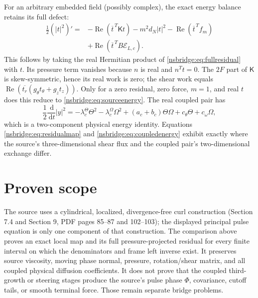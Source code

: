 \documentclass[11pt]{article}
\newcommand{\dd}{\,\mathrm d}
\begin{document}
For an arbitrary embedded field (possibly complex), the exact energy balance
retains its full defect:
\begin{equation}
 \begin{split}
 \frac12(|t|^2)'={}&-\operatorname{Re}(\overline t^{\,T}\mathsf Kt)
 -m^2d_N|t|^2-\operatorname{Re}(\overline t^{\,T}f_m)\\
 &+\operatorname{Re}(\overline t^{\,T}B\mathcal E_{L,c}).
 \end{split}
\end{equation}
This follows by taking the real Hermitian product of
\eqref{nsbridge:eq:fullresidual} with $t$. Its pressure term vanishes because $n$ is
real and $n^Tt=0$. The $2F$ part of $\mathsf K$ is skew-symmetric, hence
its real work is zero; the shear work equals
$\operatorname{Re}(\overline{t_r}(g_\theta t_\theta+g_z t_z))$.
Only for a zero residual, zero force, $m=1$, and real $t$ does this reduce
to \eqref{nsbridge:eq:sourceenergy}. The real coupled pair has
\begin{equation}
 \frac12\frac{\dd}{\dd t}|y|^2
 =-\lambda_c^\Theta\Theta^2-\lambda_c^\Omega\Omega^2
 +(a_c+b_c)\Theta\Omega+c_\theta\Theta+c_\omega\Omega,
 \label{nsbridge:eq:coupledenergy}
\end{equation}
which is a two-component physical energy identity.  Equations
\eqref{nsbridge:eq:residualmap} and \eqref{nsbridge:eq:coupledenergy} exhibit exactly where the
source's three-dimensional shear flux and the coupled pair's two-dimensional
exchange differ.

\section{Proven scope}
The source uses a cylindrical, localized, divergence-free curl construction
(Section 7.4 and Section 9, PDF pages 85--87 and 102--103); the displayed
principal pulse equation is only one component of that construction.  The
comparison above proves an exact local map and its full pressure-projected
residual for every finite interval on which the denominators and frame left
inverse exist.  It preserves source viscosity, moving phase normal, pressure,
rotation/shear matrix, and all coupled physical diffusion coefficients.  It does
not prove that the coupled third-growth or steering stages produce the source's
pulse phase $\Phi$, covariance, cutoff tails, or smooth terminal force.  Those
remain separate bridge problems.
\end{document}
